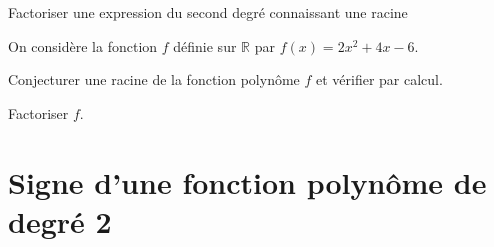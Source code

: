 	\begin{bmethodet}{Factoriser une expression du second degré connaissant une racine}
		
		On considère la fonction $f$ définie sur $\mathbb{R}$ par $f(x)=2 x^{2}+4 x-6$.
		
		\begin{enumMet}
			\item Conjecturer une racine de la fonction polynôme $f$ et vérifier par calcul.
			\item Factoriser $f$.
		\end{enumMet}
		
		
		\begin{itemMet}
			\item {}\pointille[\textwidth]
			\pointille[\textwidth]
			\item {}\pointille[\textwidth]
			\pointille[\textwidth]
			\pointille[\textwidth]
			\pointille[\textwidth]
			\pointille[\textwidth]
			\pointille[\textwidth]
			\pointille[\textwidth]
		\end{itemMet}
		
		\end{bmethodet}
	
	
	\section{Signe d'une fonction polynôme de degré 2}
	

